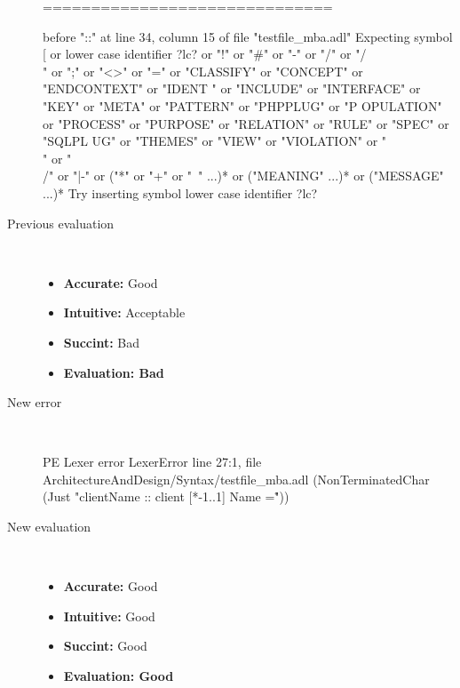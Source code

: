 \begin{description}
\begin{haskell}
==============================

before "::" at line 34, column 15 of file "testfile_mba.adl"
Expecting symbol [ or lower case identifier ?lc? or "!" or "#" or "-" or "/" or
"/\\" or ";" or "<>" or "=" or "CLASSIFY" or "CONCEPT" or "ENDCONTEXT" or "IDENT
" or "INCLUDE" or "INTERFACE" or "KEY" or "META" or "PATTERN" or "PHPPLUG" or "P
OPULATION" or "PROCESS" or "PURPOSE" or "RELATION" or "RULE" or "SPEC" or "SQLPL
UG" or "THEMES" or "VIEW" or "VIOLATION" or "\\" or "\\/" or "|-" or ("*" or "+"
 or "~" ...)* or ("MEANING" ...)* or ("MESSAGE" ...)*
Try inserting symbol lower case identifier ?lc?
\end{haskell}
  \item[Previous evaluation]~\\
    \begin{itemize}
    \item \textbf{Accurate:} Good
    \item \textbf{Intuitive:} Acceptable
    \item \textbf{Succint:} Bad
    \item \textbf{Evaluation: Bad}
    \end{itemize}
  \item[New error]~\\
\begin{haskell}
PE Lexer error LexerError line 27:1, file ArchitectureAndDesign/Syntax/testfile_mba.adl (NonTerminatedChar (Just "clientName :: client [*-1..1] Name =\r"))\end{haskell}
  \item[New evaluation]~\\
    \begin{itemize}
    \item \textbf{Accurate:} Good
    \item \textbf{Intuitive:} Good
    \item \textbf{Succint:} Good
    \item \textbf{Evaluation: Good
}
    \end{itemize}
  \end{description}

\hrulefill

